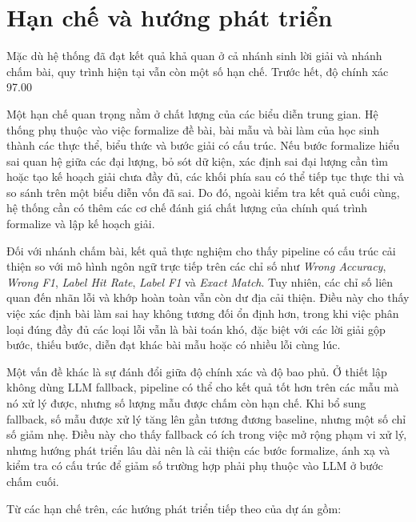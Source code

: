 \documentclass[12pt,a4paper]{article}
\begin{document}
\section{Hạn chế và hướng phát triển}

Mặc dù hệ thống đã đạt kết quả khả quan ở cả nhánh sinh lời giải và nhánh chấm bài, quy trình hiện tại vẫn còn một số hạn chế. Trước hết, độ chính xác 97.00%

Một hạn chế quan trọng nằm ở chất lượng của các biểu diễn trung gian. Hệ thống phụ thuộc vào việc formalize đề bài, bài mẫu và bài làm của học sinh thành các thực thể, biểu thức và bước giải có cấu trúc. Nếu bước formalize hiểu sai quan hệ giữa các đại lượng, bỏ sót dữ kiện, xác định sai đại lượng cần tìm hoặc tạo kế hoạch giải chưa đầy đủ, các khối phía sau có thể tiếp tục thực thi và so sánh trên một biểu diễn vốn đã sai. Do đó, ngoài kiểm tra kết quả cuối cùng, hệ thống cần có thêm các cơ chế đánh giá chất lượng của chính quá trình formalize và lập kế hoạch giải.

Đối với nhánh chấm bài, kết quả thực nghiệm cho thấy pipeline có cấu trúc cải thiện so với mô hình ngôn ngữ trực tiếp trên các chỉ số như \textit{Wrong Accuracy}, \textit{Wrong F1}, \textit{Label Hit Rate}, \textit{Label F1} và \textit{Exact Match}. Tuy nhiên, các chỉ số liên quan đến nhãn lỗi và khớp hoàn toàn vẫn còn dư địa cải thiện. Điều này cho thấy việc xác định bài làm sai hay không tương đối ổn định hơn, trong khi việc phân loại đúng đầy đủ các loại lỗi vẫn là bài toán khó, đặc biệt với các lời giải gộp bước, thiếu bước, diễn đạt khác bài mẫu hoặc có nhiều lỗi cùng lúc.

Một vấn đề khác là sự đánh đổi giữa độ chính xác và độ bao phủ. Ở thiết lập không dùng LLM fallback, pipeline có thể cho kết quả tốt hơn trên các mẫu mà nó xử lý được, nhưng số lượng mẫu được chấm còn hạn chế. Khi bổ sung fallback, số mẫu được xử lý tăng lên gần tương đương baseline, nhưng một số chỉ số giảm nhẹ. Điều này cho thấy fallback có ích trong việc mở rộng phạm vi xử lý, nhưng hướng phát triển lâu dài nên là cải thiện các bước formalize, ánh xạ và kiểm tra có cấu trúc để giảm số trường hợp phải phụ thuộc vào LLM ở bước chấm cuối.

Từ các hạn chế trên, các hướng phát triển tiếp theo của dự án gồm:
\end{document}
